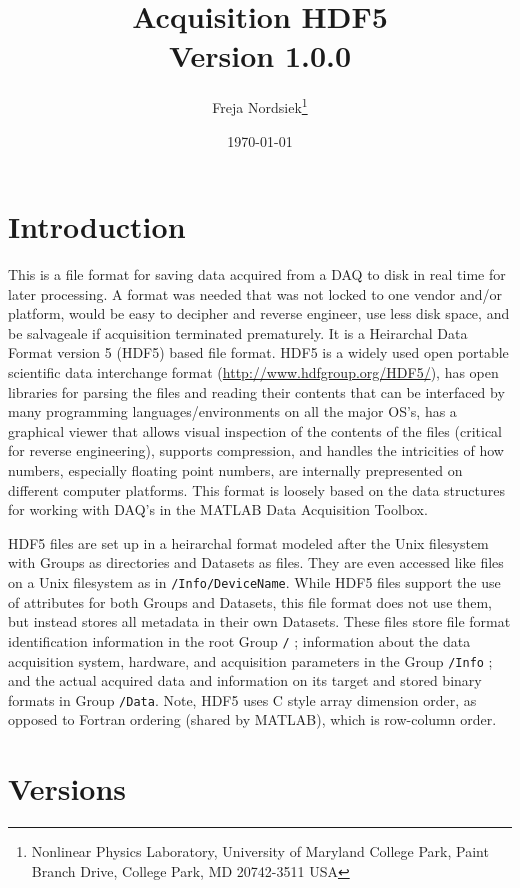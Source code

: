 \documentclass[12pt]{article} %
\title{Acquisition HDF5 \\ Version 1.0.0}
\author{Freja Nordsiek\footnote{Nonlinear Physics Laboratory, University of Maryland College Park, Paint Branch Drive, College Park, MD 20742-3511 USA}}
\date{\today}
\begin{document}
\maketitle

\tableofcontents

\section{Introduction}

This is a file format for saving data acquired from a DAQ to disk in real time for later processing.
A format was needed that was not locked to one vendor and/or platform, would be easy to decipher and reverse engineer, use less disk space, and be salvageale if acquisition terminated prematurely.
It is a Heirarchal Data Format version 5 (HDF5) based file format.
HDF5 is a widely used open portable scientific data interchange format (\url{http://www.hdfgroup.org/HDF5/}), has open libraries for parsing the files and reading their contents that can be interfaced by many programming languages/environments on all the major OS's, has a graphical viewer that allows visual inspection of the contents of the files (critical for reverse engineering), supports compression, and handles the intricities of how numbers, especially floating point numbers, are internally prepresented on different computer platforms.
This format is loosely based on the data structures for working with DAQ's in the MATLAB\textsuperscript{\textregistered} Data Acquisition Toolbox\textsuperscript{\texttrademark}.

HDF5 files are set up in a heirarchal format modeled after the Unix filesystem with Groups as directories and Datasets as files.
They are even accessed like files on a Unix filesystem as in \verb|/Info/DeviceName|.
While HDF5 files support the use of attributes for both Groups and Datasets, this file format does not use them, but instead stores all metadata in their own Datasets.
These files store file format identification information in the root Group \verb|/| ; information about the data acquisition system, hardware, and acquisition parameters in the Group \verb|/Info| ; and the actual acquired data and information on its target and stored binary formats in Group \verb|/Data|.
Note, HDF5 uses C style array dimension order, as opposed to Fortran ordering (shared by MATLAB\textsuperscript{\textregistered}), which is row-column order.

\section{Versions}
\end{document}
